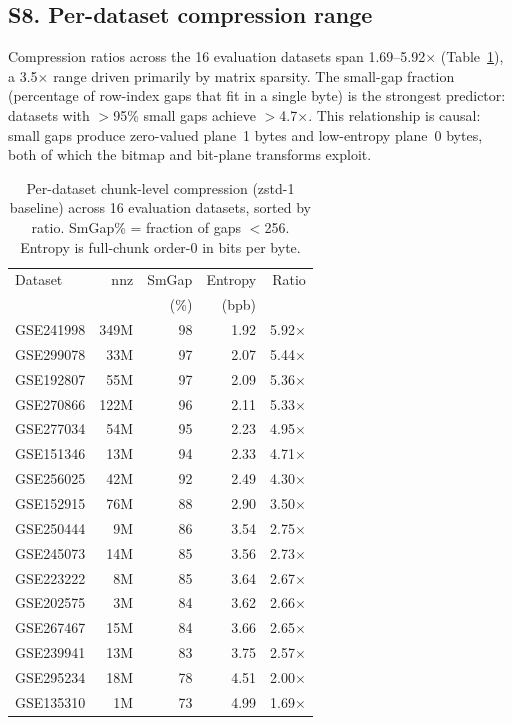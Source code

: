 \documentclass[10pt,twocolumn,letterpaper]{article}
\begin{document}
\subsection*{S8. Per-dataset compression range}

Compression ratios across the 16 evaluation datasets span 1.69--5.92$\times$ (Table~\ref{tab:per_dataset}), a 3.5$\times$ range driven primarily by matrix sparsity.
The small-gap fraction (percentage of row-index gaps that fit in a single byte) is the strongest predictor: datasets with $>$95\% small gaps achieve $>$4.7$\times$.
This relationship is causal: small gaps produce zero-valued plane~1 bytes and low-entropy plane~0 bytes, both of which the bitmap and bit-plane transforms exploit.

\begin{table}[h]
\centering
\caption{Per-dataset chunk-level compression (zstd-1 baseline) across 16 evaluation datasets, sorted by ratio. SmGap\% = fraction of gaps $<$256. Entropy is full-chunk order-0 in bits per byte.}
\label{tab:per_dataset}
\footnotesize
\begin{tabular}{lrrrr}
\toprule
Dataset & nnz & SmGap & Entropy & Ratio \\
 & & (\%) & (bpb) & \\
\midrule
GSE241998 & 349M & 98 & 1.92 & 5.92$\times$ \\
GSE299078 &  33M & 97 & 2.07 & 5.44$\times$ \\
GSE192807 &  55M & 97 & 2.09 & 5.36$\times$ \\
GSE270866 & 122M & 96 & 2.11 & 5.33$\times$ \\
GSE277034 &  54M & 95 & 2.23 & 4.95$\times$ \\
GSE151346 &  13M & 94 & 2.33 & 4.71$\times$ \\
GSE256025 &  42M & 92 & 2.49 & 4.30$\times$ \\
GSE152915 &  76M & 88 & 2.90 & 3.50$\times$ \\
GSE250444 &   9M & 86 & 3.54 & 2.75$\times$ \\
GSE245073 &  14M & 85 & 3.56 & 2.73$\times$ \\
GSE223222 &   8M & 85 & 3.64 & 2.67$\times$ \\
GSE202575 &   3M & 84 & 3.62 & 2.66$\times$ \\
GSE267467 &  15M & 84 & 3.66 & 2.65$\times$ \\
GSE239941 &  13M & 83 & 3.75 & 2.57$\times$ \\
GSE295234 &  18M & 78 & 4.51 & 2.00$\times$ \\
GSE135310 &   1M & 73 & 4.99 & 1.69$\times$ \\
\bottomrule
\end{tabular}
\end{table}
\end{document}

